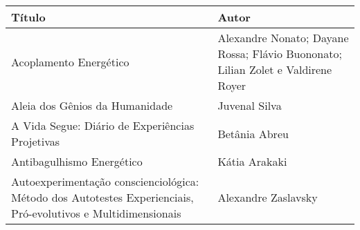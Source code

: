\documentclass{gescons}
\begin{document}
\begin{longtable}[]{@{}
  >{\raggedright\arraybackslash}p{}
  >{\raggedright\arraybackslash}p{}@{}}
\toprule\noalign{}
\begin{minipage}[b]{\linewidth}\centering
\textbf{Título}
\end{minipage} & \begin{minipage}[b]{\linewidth}\centering
\textbf{Autor}
\end{minipage} \\
\hline
\begin{minipage}[b]{\linewidth}\raggedright
Acoplamento Energético
\end{minipage} & \begin{minipage}[b]{\linewidth}\raggedright\addlinespace[2pt]
Alexandre Nonato; Dayane Rossa; Flávio Buononato; Lilian Zolet e Valdirene Royer
\end{minipage} \\
\hline
\begin{minipage}[b]{\linewidth}\raggedright
Aleia dos Gênios da Humanidade
\end{minipage} & \begin{minipage}[b]{\linewidth}\raggedright
Juvenal Silva
\end{minipage} \\
\hline
\begin{minipage}[b]{\linewidth}\raggedright
A Vida Segue: Diário de Experiências Projetivas
\end{minipage} & \begin{minipage}[b]{\linewidth}\raggedright
Betânia Abreu
\end{minipage} \\
\hline
\begin{minipage}[b]{\linewidth}\raggedright
Antibagulhismo Energético
\end{minipage} & \begin{minipage}[b]{\linewidth}\raggedright
Kátia Arakaki
\end{minipage} \\
\hline
\begin{minipage}[b]{\linewidth}\raggedright\addlinespace[2pt]
Autoexperimentação conscienciológica: Método dos Autotestes Experienciais, Pró-evolutivos e Multidimensionais
\end{minipage} & \begin{minipage}[b]{\linewidth}\raggedright
Alexandre Zaslavsky
\end{minipage} \\

\end{longtable}
\end{document}
